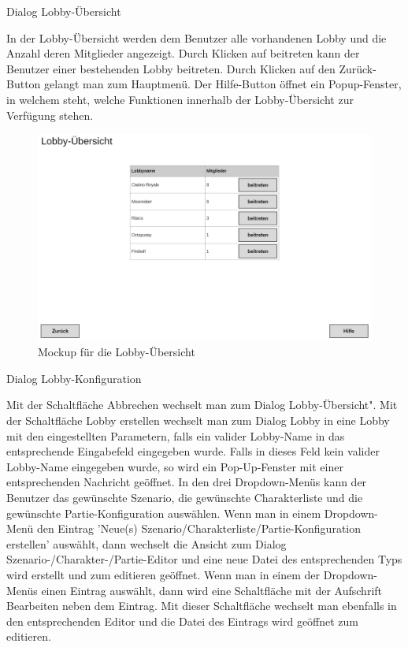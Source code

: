 Dialog \glqq{}Lobby-Übersicht\grqq{}

In der Lobby-Übersicht werden dem Benutzer alle vorhandenen Lobby und die Anzahl deren Mitglieder angezeigt. Durch Klicken auf beitreten kann der Benutzer einer bestehenden Lobby beitreten. Durch Klicken auf den Zurück-Button gelangt man zum Hauptmenü. Der Hilfe-Button öffnet ein Popup-Fenster, in welchem steht, welche Funktionen innerhalb der Lobby-Übersicht zur Verfügung stehen.

\begin{figure}
  \centering
  \includegraphics[width=\textwidth]{Meilenstein03/Lobby-Uebersicht_Mockup.png}
  \caption{Mockup für die Lobby-Übersicht}
\end{figure}

Dialog \glqq{}Lobby-Konfiguration\grqq{}

Mit der Schaltfläche \glqq{}Abbrechen\grqq{} wechselt man zum Dialog \glqq{}Lobby-Übersicht".
Mit der Schaltfläche \glqq{}Lobby erstellen\grqq{} wechselt man zum Dialog \glqq{}Lobby\grqq{} in eine Lobby mit den eingestellten Parametern, falls ein valider Lobby-Name in das entsprechende Eingabefeld eingegeben wurde.
Falls in dieses Feld kein valider Lobby-Name eingegeben wurde, so wird ein Pop-Up-Fenster mit einer entsprechenden Nachricht geöffnet.
In den drei Dropdown-Menüs kann der Benutzer das gewünschte Szenario, die gewünschte Charakterliste und die gewünschte Partie-Konfiguration auswählen. Wenn man in einem Dropdown-Menü den Eintrag 'Neue(s) Szenario/Charakterliste/Partie-Konfiguration erstellen' auswählt, dann wechselt die Ansicht zum Dialog \glqq{}Szenario-/Charakter-/Partie-Editor\grqq{} und eine neue Datei des entsprechenden Typs wird erstellt und zum editieren geöffnet.
Wenn man in einem der Dropdown-Menüs einen Eintrag auswählt, dann wird eine Schaltfläche mit der Aufschrift \glqq{}Bearbeiten\grqq{} neben dem Eintrag. Mit dieser Schaltfläche wechselt man ebenfalls in den entsprechenden Editor und die Datei des Eintrags wird geöffnet zum editieren.


